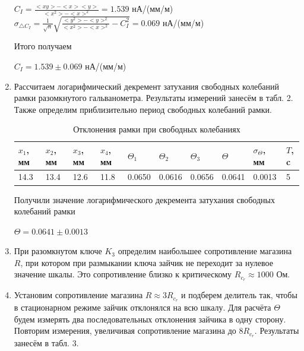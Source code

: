 \documentclass[a4paper]{article}
\begin{document}
\begin{enumerate}
\begin{center}
 $C_I = \frac{<xy>-<x><y>}{<x^2>-<x>^2} = 1.539$ нА/(мм/м)\\

$\sigma_{\triangle C_I} = \frac{1}{\sqrt{n}} \sqrt{\frac{<y^2>-<y>^2}{<x^2>-<x>^2} - C_I^2} = 0.069$ нА/(мм/м)  
\end{center}

Итого получаем
\begin{center}
    $C_I = 1.539 \pm 0.069$ нА/(мм/м)
\end{center}

\item Рассчитаем логарифмический декремент затухания свободных колебаний рамки разомкнутого гальванометра. Результаты измерений занесём в табл. 2. Также определим приблизительно период свободных колебаний рамки.

    \begin{table}[h]
    \centering
    \begin{center}
    \caption{Отклонения рамки при свободных колебаниях}
    \end{center}
    \vspace{0.1cm}
    \label{tab:my_label}
    \begin{tabular}{ |p{1.2cm}|p{1.2cm}|p{1.2cm}|p{1.2cm}|p{1.2cm}|p{1.2cm}|p{1.2cm}|p{1.2cm}|p{1.2cm}|p{1.2cm}|}
 \hline
    $x_1$, мм & $x_2$, мм & $x_3$, мм & $x_4$, мм & $\Theta_1$ & $\Theta_2$ & $\Theta_3$ & $\Theta$ & $\sigma_\Theta$, мм & $T$, c  \\
\hline
    14.3 & 13.4 & 12.6 & 11.8 & 0.0650 & 0.0616 & 0.0656 & 0.0641  & 0.0013 & 5\\
\hline
    \end{tabular}
\end{table} 

Получили значение логарифмического декремента затухания свободных колебаний рамки
\begin{center}
   $\Theta = 0.0641 \pm 0.0013$ 
\end{center}

\item При разомкнутом ключе $K_3$ определим наибольшее сопротивление магазина $R$, при котором при размыкании ключа зайчик не переходит за нулевое значение шкалы. Это сопротивление близко к критическому $R_c_r \approx 1000$ Ом.

\item Установим сопротивление магазина $R \approx 3R_c_r$ и подберем делитель так, чтобы в стационарном режиме зайчик отклонялся на всю шкалу. Для расчёта $\Theta$ будем измерять два последовательных отклонения зайчика в одну сторону. Повторим измерения, увеличивая сопротивление магазина до $8R_c_r$. Результаты занесём в табл. 3.


\end{enumerate}
\end{document}
